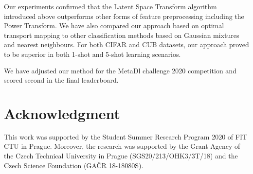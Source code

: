 \documentclass[letterpaper]{article} \usepackage{aaai20}  \usepackage{times}  \usepackage{helvet} \usepackage{courier}  \usepackage[hyphens]{url}  \usepackage{graphicx} \urlstyle{rm} \def\UrlFont{\rm}  \usepackage{graphicx}  \frenchspacing  \setlength{\pdfpagewidth}{8.5in}  \setlength{\pdfpageheight}{11in}  \usepackage[ruled,vlined]{algorithm2e}
\begin{document}
Our experiments confirmed that the Latent Space Transform algorithm introduced above outperforms other forms of feature preprocessing including the Power Transform. We have also compared our approach based on optimal transport mapping to other classification methods based on Gaussian mixtures and nearest neighbours. For both CIFAR and CUB datasets, our approach proved to be superior in both 1-shot and 5-shot learning scenarios. 

We have adjusted our method for the MetaDl challenge 2020 competition and scored second in the final leaderboard.

\section{Acknowledgment}
This work was supported by the Student Summer Research Program 2020 of FIT CTU in Prague. Moreover, the research was supported by the Grant Agency of the Czech Technical University in Prague (SGS20/213/OHK3/3T/18) and the Czech Science Foundation (GA\v{C}R 18-18080S).



\end{document}
